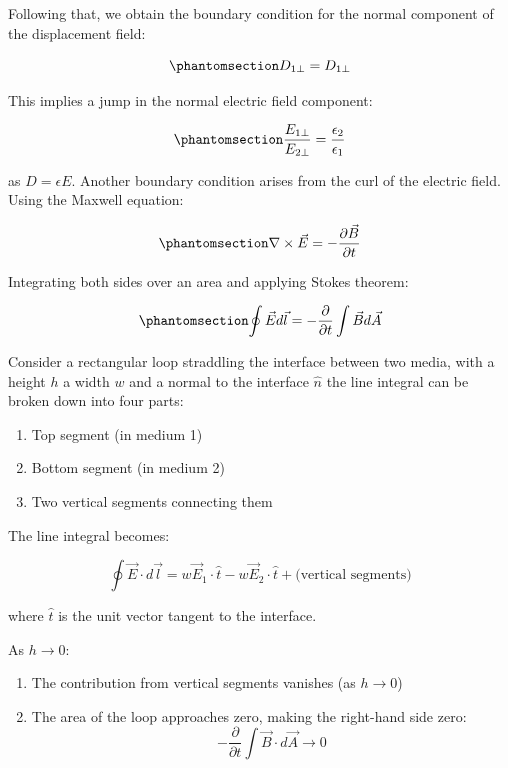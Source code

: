 \documentclass[
  a4paper,
]{book}
\providecommand{\tightlist}{%
  \setlength{\itemsep}{0pt}\setlength{\parskip}{0pt}}
\begin{document}
Following that, we obtain the boundary condition for the normal
component of the displacement field:

\begin{equation}\phantomsection\label{eq-d-perpendicular}{
D_{1\perp}=D_{1\perp}
}\end{equation}

This implies a jump in the normal electric field component:

\begin{equation}\phantomsection\label{eq-e-perpendicular}{
\frac{E_{1\perp}}{E_{2\perp}}=\frac{\epsilon_2}{\epsilon_1}
}\end{equation}

as \(D=\epsilon E\). Another boundary condition arises from the curl of
the electric field. Using the Maxwell equation:

\begin{equation}\phantomsection\label{eq-maxwell-faraday}{
\nabla \times \vec{E}=-\frac{\partial \vec{B}}{\partial t}
}\end{equation}

Integrating both sides over an area and applying Stokes theorem:

\begin{equation}\phantomsection\label{eq-stokes}{
\oint \vec{E} d\vec{l}=-\frac{\partial}{\partial t}\int \vec{B}d\vec{A}
}\end{equation}

Consider a rectangular loop straddling the interface between two media,
with a height \(h\) a width \(w\) and a normal to the interface
\(\hat{n}\) the line integral can be broken down into four parts:

\begin{enumerate}
\def\labelenumi{\arabic{enumi}.}
\tightlist
\item
  Top segment (in medium 1)
\item
  Bottom segment (in medium 2)
\item
  Two vertical segments connecting them
\end{enumerate}

The line integral becomes:

\[
\oint \vec{E} \cdot d\vec{l} = w\vec{E}_1 \cdot \hat{t} - w\vec{E}_2 \cdot \hat{t} + \text{(vertical segments)}
\]

where \(\hat{t}\) is the unit vector tangent to the interface.

As \(h \to 0\):

\begin{enumerate}
\def\labelenumi{\arabic{enumi}.}
\tightlist
\item
  The contribution from vertical segments vanishes (as \(h \to 0\))
\item
  The area of the loop approaches zero, making the right-hand side zero:
  \[-\frac{\partial}{\partial t}\int \vec{B}\cdot d\vec{A} \to 0\]
\end{enumerate}
\end{document}
